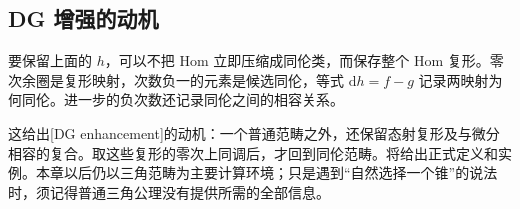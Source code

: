 \subsection{DG 增强的动机}
\label{b4:subsec:1604:03}

要保留上面的 \(h\)，可以不把 Hom 立即压缩成同伦类，而保存整个 Hom 复形。零次余圈是复形映射，次数负一的元素是候选同伦，等式 \(\mathrm{d}h=f-g\) 记录两映射为何同伦。进一步的负次数还记录同伦之间的相容关系。

\ProseParagraphBreak
这给出[DG enhancement]的动机：一个普通范畴之外，还保留态射复形及与微分相容的复合。取这些复形的零次上同调后，才回到同伦范畴。将给出正式定义和实例。本章以后仍以三角范畴为主要计算环境；只是遇到“自然选择一个锥”的说法时，须记得普通三角公理没有提供所需的全部信息。
